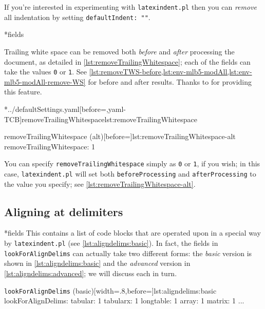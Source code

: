 	If you're interested in experimenting with \texttt{latexindent.pl} then you can
	\emph{remove} all indentation by setting \texttt{defaultIndent: ""}.

*{fields}\label{yaml:removeTrailingWhitespace}

	Trailing white space can be removed both \emph{before} and
	\emph{after} processing the document, as detailed in \cref{lst:removeTrailingWhitespace};
	each of the fields can take the values \texttt{0} or
	\texttt{1}. See \vref{lst:removeTWS-before,lst:env-mlb5-modAll,lst:env-mlb5-modAll-remove-WS} for before and after results. Thanks
	to \cite{vosskuhle} for providing this feature.

	\begin{minipage}{.4\textwidth}
		\cmhlistingsfromfile[style=removeTrailingWhitespace]*{../defaultSettings.yaml}[before=\centering,yaml-TCB]{removeTrailingWhitespace}{lst:removeTrailingWhitespace}
	\end{minipage}%
	\hfill
	\begin{minipage}{.5\textwidth}
		\begin{yaml}[numbers=none]{removeTrailingWhitespace (alt)}[before=\centering]{lst:removeTrailingWhitespace-alt}
removeTrailingWhitespace: 1
\end{yaml}
	\end{minipage}%

	You can specify \texttt{removeTrailingWhitespace} simply as \texttt{0} or
	\texttt{1}, if you wish; in this case,%
	 \texttt{latexindent.pl} will set both \texttt{beforeProcessing} and
	\texttt{afterProcessing} to the value you specify; see \cref{lst:removeTrailingWhitespace-alt}.

\subsection{Aligning at delimiters}
*{fields}
	This contains a list of code blocks that are operated upon in a special way by
	\texttt{latexindent.pl} (see \cref{lst:aligndelims:basic}). In fact, the fields in \texttt{lookForAlignDelims} can actually take
	two different forms: the \emph{basic} version is shown in
	\cref{lst:aligndelims:basic} and the \emph{advanced} version in
	\cref{lst:aligndelims:advanced}; we will discuss each in turn.

	\begin{yaml}[numbers=none]{\texttt{lookForAlignDelims} (basic)}[width=.8\linewidth,before=\centering]{lst:aligndelims:basic}
lookForAlignDelims:
   tabular: 1
   tabularx: 1
   longtable: 1
   array: 1
   matrix: 1
   ...
	\end{yaml}


